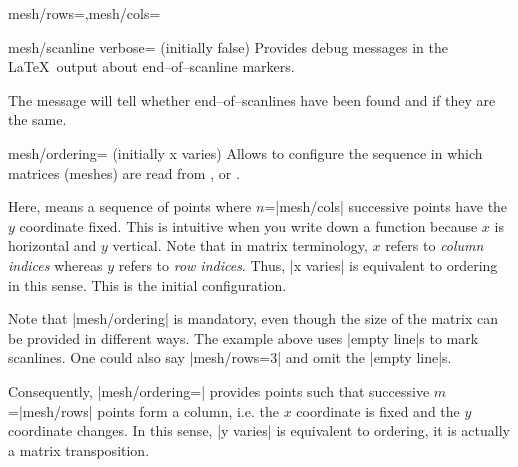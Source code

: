 {\begin{pgfplotskeylist}{mesh/rows=,mesh/cols=}
\end{pgfplotskeylist}

\begin{pgfplotskeylist}{mesh/scanline verbose= (initially false)}
	Provides debug messages in the \LaTeX\ output about end--of--scanline markers.

	The message will tell whether end--of--scanlines have been found and if they are the same.
\end{pgfplotskeylist}

\begin{pgfplotskey}{mesh/ordering= (initially x varies)}
	Allows to configure the sequence in which matrices (meshes) are read from ,  or .

	Here,  means a sequence of points where $n$=|mesh/cols| successive points have the $y$ coordinate fixed. This is intuitive when you write down a function because $x$ is horizontal and $y$ vertical. Note that in matrix terminology, $x$ refers to \emph{column indices} whereas $y$ refers to \emph{row indices}. Thus, |x varies| is equivalent to  ordering in this sense. This is the initial configuration.
	
\begin{codeexample}[]
\end{codeexample}
	\noindent Note that |mesh/ordering| is mandatory, even though the size of the matrix can be provided in different ways. The example above uses |empty line|s to mark scanlines. One could also say |mesh/rows=3| and omit the |empty line|s.

	Consequently, |mesh/ordering=| provides points such that successive $m$=|mesh/rows| points form a column, i.e. the $x$ coordinate is fixed and the $y$ coordinate changes. In this sense, |y varies| is equivalent to  ordering, it is actually a matrix transposition.
\begin{codeexample}[]
\end{codeexample}
\end{pgfplotskey}}
